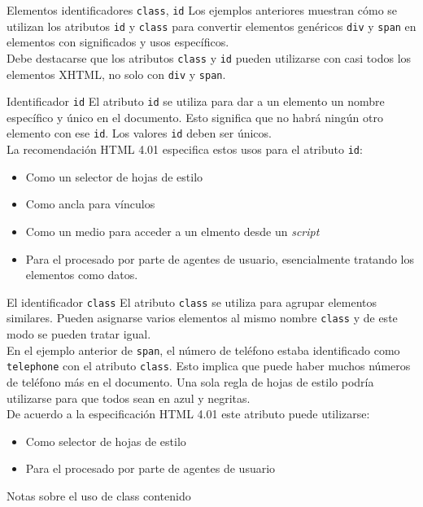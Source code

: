 \begin{frame}{Elementos identificadores \texttt{class}, \texttt{id}} %
    Los ejemplos anteriores muestran cómo se utilizan los atributos \texttt{id}
    y \texttt{class} para convertir elementos genéricos \texttt{div} y
    \texttt{span} en elementos con significados y usos específicos. \\[0.5cm]

    Debe destacarse que los atributos \texttt{class} y \texttt{id} pueden
    utilizarse con casi todos los elementos XHTML, no solo con \texttt{div} y
    \texttt{span}. 
\end{frame}

\begin{frame}{Identificador \texttt{id}} %
    El atributo \texttt{id} se utiliza para dar a un elemento un nombre
    específico y único en el documento. Esto significa que no habrá ningún otro
    elemento con ese \texttt{id}. Los valores \texttt{id} deben ser únicos. \\
    La recomendación HTML 4.01 especifica estos usos para el atributo
    \texttt{id}: 

    \begin{itemize}
        \item Como un selector de hojas de estilo
        \item Como ancla para vínculos 
        \item Como un medio para acceder a un elmento desde un \textit{script}
        \item Para el procesado por parte de agentes de usuario, esencialmente
        tratando los elementos como datos.
    \end{itemize}

\end{frame}

\begin{frame}{El identificador \texttt{class}} %
    El atributo \texttt{class} se utiliza para agrupar elementos similares.
    Pueden asignarse varios elementos al mismo nombre \texttt{class} y de este
    modo se pueden tratar igual. \\
    En el ejemplo anterior de \texttt{span}, el número de teléfono estaba
    identificado como \texttt{telephone} con el atributo \texttt{class}. Esto
    implica que puede haber muchos números de teléfono más en el documento. Una
    sola regla de hojas de estilo podría utilizarse para que todos sean en azul
    y negritas. \\
    De acuerdo a la especificación HTML 4.01 este atributo puede utilizarse: 

    \begin{itemize}
        \item Como selector de hojas de estilo
        \item Para el procesado por parte de agentes de usuario
    \end{itemize}
\end{frame}


\begin{frame}{Notas sobre el uso de class} %
    contenido
\end{frame}




